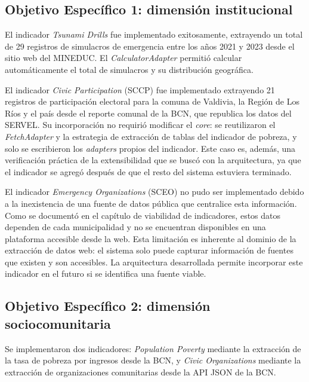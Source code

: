 \documentclass[12pt,letterpaper,oneside]{report}
\begin{document}
\subsection{Objetivo Espec\'ifico 1: dimensi\'on institucional}
\label{sec:conclusion-oe1}

El indicador \textit{Tsunami Drills} fue implementado exitosamente, extrayendo un total de 29 registros de simulacros de emergencia entre los a\~nos 2021 y 2023 desde el sitio web del MINEDUC. El \textit{CalculatorAdapter} permiti\'o calcular autom\'aticamente el total de simulacros y su distribuci\'on geogr\'afica.

El indicador \textit{Civic Participation} (SCCP) fue implementado extrayendo 21 registros de participaci\'on electoral para la comuna de Valdivia, la Regi\'on de Los R\'ios y el pa\'is desde el reporte comunal de la BCN, que republica los datos del SERVEL. Su incorporaci\'on no requiri\'o modificar el \textit{core}: se reutilizaron el \textit{FetchAdapter} y la estrategia de extracci\'on de tablas del indicador de pobreza, y solo se escribieron los \textit{adapters} propios del indicador. Este caso es, adem\'as, una verificaci\'on pr\'actica de la extensibilidad que se busc\'o con la arquitectura, ya que el indicador se agreg\'o despu\'es de que el resto del sistema estuviera terminado.

El indicador \textit{Emergency Organizations} (SCEO) no pudo ser implementado debido a la inexistencia de una fuente de datos p\'ublica que centralice esta informaci\'on. Como se document\'o en el cap\'itulo de viabilidad de indicadores, estos datos dependen de cada municipalidad y no se encuentran disponibles en una plataforma accesible desde la web. Esta limitaci\'on es inherente al dominio de la extracci\'on de datos web: el sistema solo puede capturar informaci\'on de fuentes que existen y son accesibles. La arquitectura desarrollada permite incorporar este indicador en el futuro si se identifica una fuente viable.

\subsection{Objetivo Espec\'ifico 2: dimensi\'on sociocomunitaria}
\label{sec:conclusion-oe2}

Se implementaron dos indicadores: \textit{Population Poverty} mediante la extracci\'on de la tasa de pobreza por ingresos desde la BCN, y \textit{Civic Organizations} mediante la extracci\'on de organizaciones comunitarias desde la API JSON de la BCN.
\end{document}
